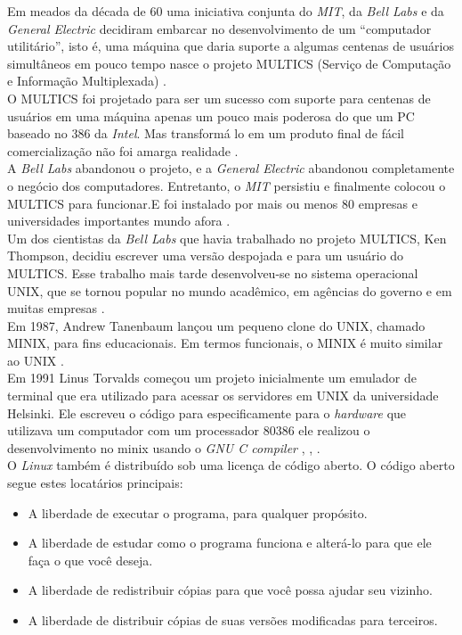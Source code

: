 Em meados da década de 60 uma iniciativa conjunta do \emph{MIT}, da \emph{Bell Labs}  e da \emph{General Electric} decidiram embarcar no desenvolvimento de um “computador utilitário”, isto é, uma máquina que daria suporte a algumas centenas de usuários simultâneos em pouco tempo nasce o projeto MULTICS (Serviço de Computação e Informação Multiplexada) \cite{Tanenbaum2016}.\\
O MULTICS foi projetado para ser um sucesso com suporte para centenas de usuários em uma máquina apenas um pouco mais poderosa do que um PC baseado no 386 da \emph{Intel}. Mas transformá lo em um produto final de fácil comercialização não foi amarga realidade \cite{Tanenbaum2016}.\\
A \emph{Bell Labs} abandonou o projeto, e a \emph{General Electric} abandonou completamente o negócio dos computadores. Entretanto, o \emph{MIT} persistiu e finalmente colocou o MULTICS para funcionar.E foi instalado por mais ou menos 80 empresas e universidades importantes mundo afora \cite{Tanenbaum2016}.\\
Um dos cientistas da \emph{Bell Labs} que havia trabalhado no projeto MULTICS, Ken Thompson, decidiu escrever uma versão despojada e para um usuário do MULTICS. Esse trabalho mais tarde desenvolveu-se no sistema operacional UNIX, que se tornou popular no mundo acadêmico, em agências do governo e em muitas empresas \cite{Tanenbaum2016}.\\
Em 1987, Andrew Tanenbaum lançou um pequeno clone do UNIX, chamado MINIX, para fins educacionais. Em termos funcionais, o MINIX é muito similar ao UNIX \cite{Tanenbaum2016}.\\
Em 1991 Linus Torvalds começou um projeto inicialmente um emulador de terminal que era utilizado para acessar os servidores em UNIX da universidade Helsinki. Ele escreveu o código para especificamente  para o \emph{hardware} que utilizava um computador com um processador 80386 ele realizou o desenvolvimento no minix usando o \emph{GNU C compiler} \cite{Torvalds1991}, \cite{Torvalds1993}, \cite{torvalds2002}.\\
O \emph{Linux} também é distribuído sob uma licença de código aberto. O código aberto segue estes locatários principais:
\begin{itemize}
    \item A liberdade de executar o programa, para qualquer propósito.
    \item A liberdade de estudar como o programa funciona e alterá-lo para que ele faça o que você deseja.
    \item A liberdade de redistribuir cópias para que você possa ajudar seu vizinho.
    \item A liberdade de distribuir cópias de suas versões modificadas para terceiros.
\end{itemize}
